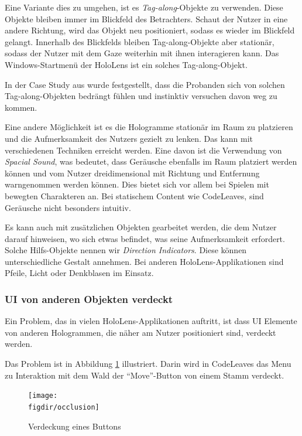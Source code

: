 Eine Variante dies zu umgehen, ist es \textit{Tag-along}-Objekte zu verwenden. Diese Objekte bleiben immer im Blickfeld des Betrachters. Schaut der Nutzer in eine andere Richtung, wird das Objekt neu positioniert, sodass es wieder im Blickfeld gelangt. Innerhalb des Blickfelds bleiben Tag-along-Objekte aber stationär, sodass der Nutzer mit dem Gaze weiterhin mit ihnen interagieren kann. Das Windows-Startmenü der HoloLens ist ein solches Tag-along-Objekt.

In der Case Study aus \cite{windows2017casestudy3} wurde festgestellt, dass die Probanden sich von solchen Tag-along-Objekten bedrängt fühlen und instinktiv versuchen davon weg zu kommen.

Eine andere Möglichkeit ist es die Hologramme stationär im Raum zu platzieren und die Aufmerksamkeit des Nutzers gezielt zu lenken. Das kann mit verschiedenen Techniken erreicht werden. Eine davon ist die Verwendung von \textit{Spacial Sound}, was bedeutet, dass Geräusche ebenfalls im Raum platziert werden können und vom Nutzer dreidimensional mit Richtung und Entfernung warngenommen werden können. Dies bietet sich vor allem bei Spielen mit bewegten Charakteren an. Bei statischem Content wie CodeLeaves, sind Geräusche nicht besonders intuitiv.

Es kann auch mit zusätzlichen Objekten gearbeitet werden, die dem Nutzer darauf hinweisen, wo sich etwas befindet, was seine Aufmerksamkeit erfordert. Solche Hilfs-Objekte nennen wir \textit{Direction Indicators}. Diese können unterschiedliche Gestalt annehmen. Bei anderen HoloLens-Applikationen sind Pfeile, Licht oder Denkblasen im Einsatz.

\subsubsection*{UI von anderen Objekten verdeckt}

Ein Problem, das in vielen HoloLens-Applikationen auftritt, ist dass UI Elemente von anderen Hologrammen, die näher am Nutzer positioniert sind, verdeckt werden.

Das Problem ist in Abbildung \ref{fig:occlusion} illustriert. Darin wird in CodeLeaves das Menu zu Interaktion mit dem Wald der "`Move"'-Button von einem Stamm verdeckt.

\begin{figure}[htb]
  \texttt{[image: \\figdir/occlusion]}
  \caption{Verdeckung eines Buttons}
  \label{fig:occlusion}
\end{figure}

